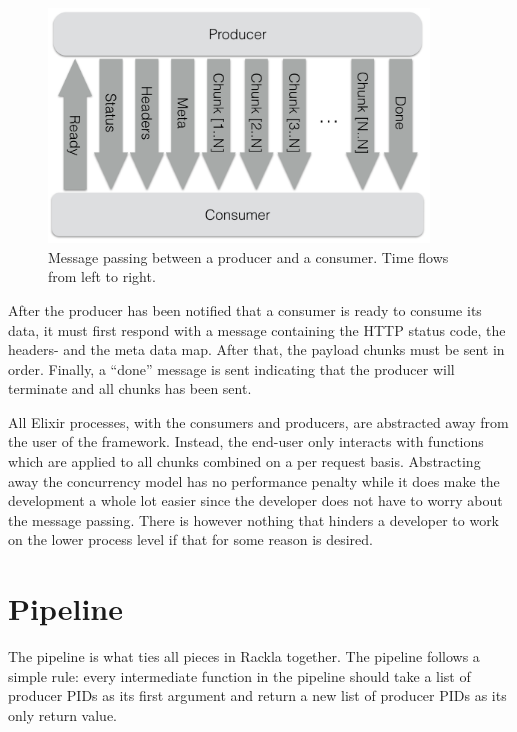 \documentclass{cslthse-msc}
\begin{document}
\begin{figure}[H]
  \centering
    \begin{center}
      \includegraphics[width=0.9\textwidth]{images/crocpear_producer_consumer.png}
    \end{center}
  \caption{Message passing between a producer and a consumer. Time flows from left to right.}
\end{figure}

After the producer has been notified that a consumer is ready to consume its data, it must first respond with a message containing the HTTP status code, the headers- and the meta data map. After that, the payload chunks must be sent in order. Finally, a \enquote{done} message is sent indicating that the producer will terminate and all chunks has been sent.

All Elixir processes, with the consumers and producers, are abstracted away from the user of the framework. Instead, the end-user only interacts with functions which are applied to all chunks combined on a per request basis. Abstracting away the concurrency model has no performance penalty while it does make the development a whole lot easier since the developer does not have to worry about the message passing. There is however nothing that hinders a developer to work on the lower process level if that for some reason is desired.

\section{Pipeline}
The pipeline is what ties all pieces in Rackla together. The pipeline follows a simple rule: every intermediate function in the pipeline should take a list of producer PIDs as its first argument and return a new list of producer PIDs as its only return value.
\end{document}

